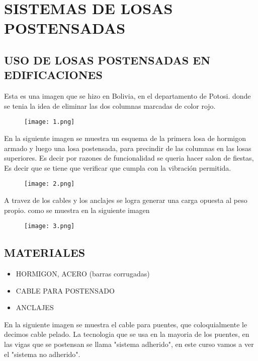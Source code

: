 \color{white}
\pagecolor{black_background}

\tableofcontents
\newpage

\chapter{SISTEMAS DE LOSAS POSTENSADAS}
\newpage

\section{USO DE LOSAS POSTENSADAS EN EDIFICACIONES}

Esta es una imagen que se hizo en Bolivia, en el departamento de
Potosi. donde se tenia la idea de eliminar las dos columnas marcadas
de color rojo.

\begin{figure}[H]
\centering
\texttt{[image: 1.png]}
\end{figure}

En la siguiente imagen se muestra un esquema de la primera losa 
de hormigon armado y luego una losa postensada, para precindir 
de las columnas en las losas superiores. Es decir por razones
de funcionalidad se queria hacer salon de fiestas, Es decir que
se tiene que verificar que cumpla con la vibración permitida.

\begin{figure}[H]
\centering
\texttt{[image: 2.png]}
\end{figure}

A travez de los cables y los anclajes se logra generar una carga
opuesta al peso propio. como se muestra en la siguiente imagen

\begin{figure}[H]
\centering
\texttt{[image: 3.png]}
\end{figure}

\section{MATERIALES}

\begin{itemize}
	\item HORMIGON, ACERO (barras corrugadas)
	\item CABLE PARA POSTENSADO
	\item ANCLAJES
\end{itemize}

En la siguiente imagen se muestra el cable para puentes, que coloquialmente
le decimos cable pelado. La tecnologia que se usa en la mayoria de los puentes,
en las vigas que se postensan se llama "sistema adherido",
en este curso vamos a ver el "sistema no adherido".

